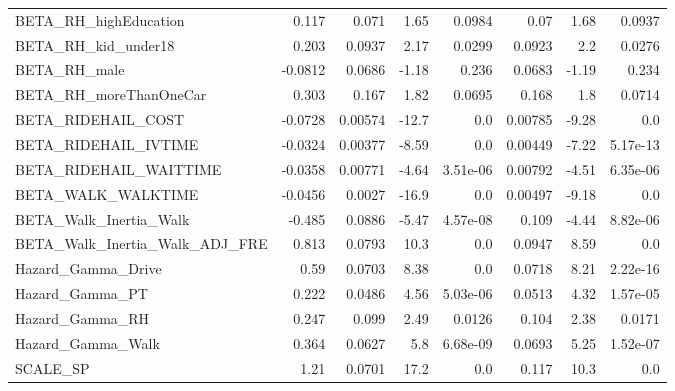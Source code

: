 \begin{tabular}{lrrrrrrr}
BETA\_RH\_highEducation            &    0.117 &    0.071 &    1.65 &   0.0984 &          0.07 &         1.68 &        0.0937 \\
BETA\_RH\_kid\_under18              &    0.203 &   0.0937 &    2.17 &   0.0299 &        0.0923 &          2.2 &        0.0276 \\
BETA\_RH\_male                     &  -0.0812 &   0.0686 &   -1.18 &    0.236 &        0.0683 &        -1.19 &         0.234 \\
BETA\_RH\_moreThanOneCar           &    0.303 &    0.167 &    1.82 &   0.0695 &         0.168 &          1.8 &        0.0714 \\
BETA\_RIDEHAIL\_COST               &  -0.0728 &  0.00574 &   -12.7 &      0.0 &       0.00785 &        -9.28 &           0.0 \\
BETA\_RIDEHAIL\_IVTIME             &  -0.0324 &  0.00377 &   -8.59 &      0.0 &       0.00449 &        -7.22 &      5.17e-13 \\
BETA\_RIDEHAIL\_WAITTIME           &  -0.0358 &  0.00771 &   -4.64 & 3.51e-06 &       0.00792 &        -4.51 &      6.35e-06 \\
BETA\_WALK\_WALKTIME               &  -0.0456 &   0.0027 &   -16.9 &      0.0 &       0.00497 &        -9.18 &           0.0 \\
BETA\_Walk\_Inertia\_Walk           &   -0.485 &   0.0886 &   -5.47 & 4.57e-08 &         0.109 &        -4.44 &      8.82e-06 \\
BETA\_Walk\_Inertia\_Walk\_ADJ\_FRE   &    0.813 &   0.0793 &    10.3 &      0.0 &        0.0947 &         8.59 &           0.0 \\
Hazard\_Gamma\_Drive               &     0.59 &   0.0703 &    8.38 &      0.0 &        0.0718 &         8.21 &      2.22e-16 \\
Hazard\_Gamma\_PT                  &    0.222 &   0.0486 &    4.56 & 5.03e-06 &        0.0513 &         4.32 &      1.57e-05 \\
Hazard\_Gamma\_RH                  &    0.247 &    0.099 &    2.49 &   0.0126 &         0.104 &         2.38 &        0.0171 \\
Hazard\_Gamma\_Walk                &    0.364 &   0.0627 &     5.8 & 6.68e-09 &        0.0693 &         5.25 &      1.52e-07 \\
SCALE\_SP                         &     1.21 &   0.0701 &    17.2 &      0.0 &         0.117 &         10.3 &           0.0 \\
\bottomrule
\end{tabular}

